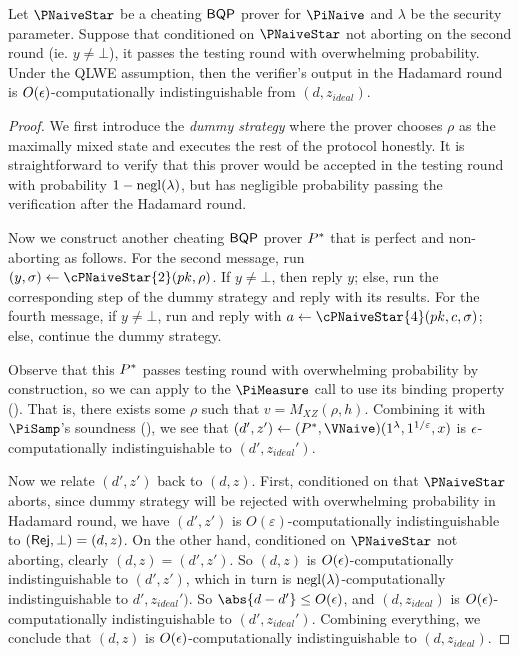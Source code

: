 \begin{theorem}
	\label{lem:naive-qpip0-binding}
	Let $\PNaiveStar$ be a cheating $\operatorname{\mathsf{BQP}}$ prover for $\PiNaive$ and $\lambda$ be the security parameter.
	Suppose that conditioned on $\PNaiveStar$ not aborting on the second round (ie. $y\ne\bot$), it passes the testing round with overwhelming probability.
	Under the QLWE assumption, then the verifier's output in the Hadamard round is $O(\epsilon)$-computationally indistinguishable from $(d, z_{ideal})$.
\end{theorem}
\begin{proof}
	We first introduce the \emph{dummy strategy} where the prover chooses $\rho$ as the maximally mixed state and executes the rest of the protocol honestly.
	It is straightforward to verify that this prover would be accepted in the testing round with probability $1-\operatorname{negl}(\lambda)$,
	but has negligible probability passing the verification after the Hadamard round.

	Now we construct another cheating $\operatorname{\mathsf{BQP}}$ prover $P^*$ that is perfect and non-aborting as follows.
	For the second message, run $(y, \sigma)\leftarrow\cPNaiveStar{2}(pk, \rho)$.
	If $y\ne\bot$, then reply $y$;
	else, run the corresponding step of the dummy strategy and reply with its results.
	For the fourth message, if $y\ne\bot$, run and reply with $a\leftarrow\cPNaiveStar{4}(pk, c, \sigma)$;
	else, continue the dummy strategy.

	Observe that this $P^*$ passes testing round with overwhelming probability by construction,
	so we can apply  to the $\PiMeasure$ call to use its binding property ().
	That is, there exists some $\rho$ such that $v=M_{XZ}(\rho, h)$.
	Combining it with $\PiSamp$'s soundness (),
	we see that $(d', z')\leftarrow(\Pstar, \VNaive)(1^\lambda, 1^{1/\varepsilon}, x)$ is $\epsilon$-computationally indistinguishable to $(d', z_{ideal}')$.

	Now we relate $(d', z')$ back to $(d, z)$.
	First, conditioned on that $\PNaiveStar$ aborts, since dummy strategy will be rejected with overwhelming probability in Hadamard round,
	we have $(d', z')$ is $O(\varepsilon)$-computationally indistinguishable to $(\mathsf{Rej}, \bot)=(d, z)$.
	On the other hand, conditioned on $\PNaiveStar$ not aborting, clearly $(d, z)=(d', z')$.
	So $(d, z)$ is $O(\epsilon)$-computationally indistinguishable to $(d', z')$,
	which in turn is $\operatorname{negl}(\lambda)$-computationally indistinguishable to $d', z_{ideal}')$.
	So $\abs{d-d'}\leq O(\eps)$,
	and $(d, z_{ideal})$ is $O(\epsilon)$-computationally indistinguishable to $(d', z_{ideal}')$.
	Combining everything, we conclude that $(d, z)$ is $O(\epsilon)$-computationally indistinguishable to $(d, z_{ideal})$.
\end{proof}

